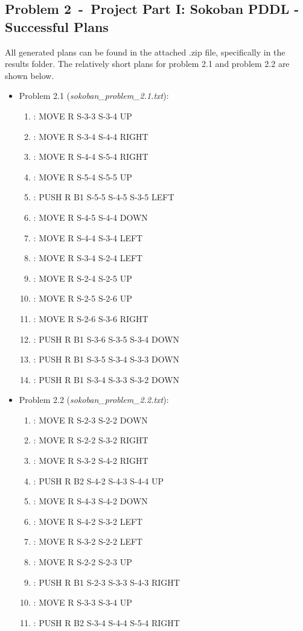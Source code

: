 \documentclass[12pt]{article}
\newcommand{\problem}[2]{\section*{Problem {#1}~-~{#2}}}
\begin{document}
\newpage
\begin{appendix}
\problem{2}{Project Part I: Sokoban PDDL - Successful Plans}
  All generated plans can be found in the attached .zip file, specifically in the results folder. The relatively short plans for problem 2.1 and problem 2.2 are shown below. 
  \begin{itemize}
    \item Problem 2.1 (\textit{sokoban\_problem\_2.1.txt}):
      \begin{enumerate}
	\item: MOVE R S-3-3 S-3-4 UP
	\item: MOVE R S-3-4 S-4-4 RIGHT
	\item: MOVE R S-4-4 S-5-4 RIGHT
	\item: MOVE R S-5-4 S-5-5 UP
	\item: PUSH R B1 S-5-5 S-4-5 S-3-5 LEFT
	\item: MOVE R S-4-5 S-4-4 DOWN
	\item: MOVE R S-4-4 S-3-4 LEFT
	\item: MOVE R S-3-4 S-2-4 LEFT
	\item: MOVE R S-2-4 S-2-5 UP
	\item: MOVE R S-2-5 S-2-6 UP
	\item : MOVE R S-2-6 S-3-6 RIGHT
	\item: PUSH R B1 S-3-6 S-3-5 S-3-4 DOWN
	\item: PUSH R B1 S-3-5 S-3-4 S-3-3 DOWN
	\item: PUSH R B1 S-3-4 S-3-3 S-3-2 DOWN
      \end{enumerate}
    \item Problem 2.2 (\textit{sokoban\_problem\_2.2.txt}):
      \begin{enumerate}
	\item: MOVE R S-2-3 S-2-2 DOWN
	\item: MOVE R S-2-2 S-3-2 RIGHT
	\item: MOVE R S-3-2 S-4-2 RIGHT
	\item: PUSH R B2 S-4-2 S-4-3 S-4-4 UP
	\item: MOVE R S-4-3 S-4-2 DOWN
	\item: MOVE R S-4-2 S-3-2 LEFT
	\item: MOVE R S-3-2 S-2-2 LEFT
	\item: MOVE R S-2-2 S-2-3 UP
	\item: PUSH R B1 S-2-3 S-3-3 S-4-3 RIGHT
	\item: MOVE R S-3-3 S-3-4 UP
	\item: PUSH R B2 S-3-4 S-4-4 S-5-4 RIGHT

\end{enumerate}
\end{itemize}
\end{appendix}
\end{document}
